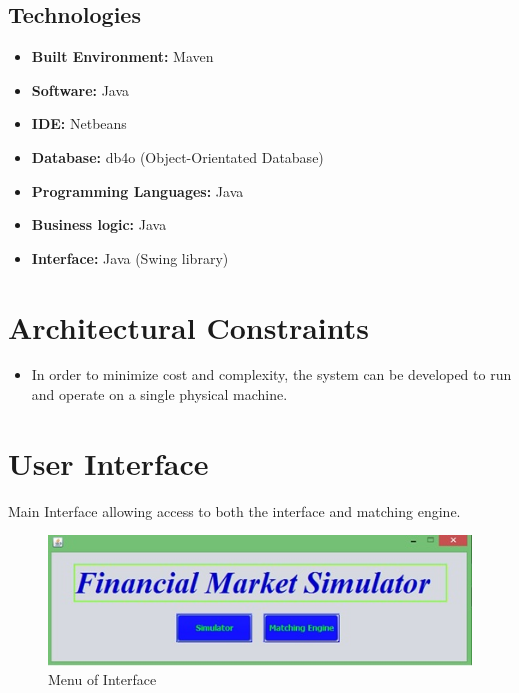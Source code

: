 \documentclass[12pt]{article}
\begin{document}
                \subsection{Technologies}
                    \begin{itemize}
                        \item \textbf{Built Environment:} Maven
                        \item \textbf{Software:} Java
                        \item \textbf{IDE:} Netbeans
                        \item \textbf{Database:} db4o (Object-Orientated Database)
                        \item \textbf{Programming Languages:} Java
                        \item \textbf{Business logic:} Java
                        \item \textbf{Interface:} Java (Swing library)
                    \end{itemize}

		\section{Architectural Constraints}
		\begin{itemize}
		\item In order to minimize cost and complexity, the system can be developed to run and operate on a single physical machine. 
		\end{itemize}

        \newpage
	\section{User Interface}
           Main Interface allowing access to both the interface and matching engine.
            
            \begin{figure}[th]
             \centering
             \includegraphics[scale=0.8]{./maininterface}
             \caption{Menu of Interface}
             \label{Main Interface}
            \end{figure}
            
\end{document}

